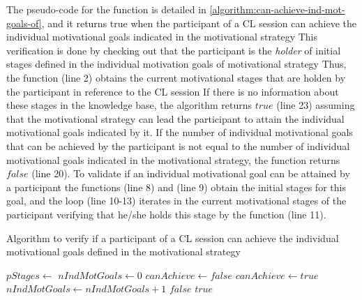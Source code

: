 The pseudo-code for the function  is detailed in \autoref{algorithm:can-achieve-ind-mot-goals-of}, and it returns true when the participant  of a CL session  can achieve the individual motivational goals indicated in the motivational strategy  This verification is done by checking out that the participant  is the \emph{holder} of initial stages defined in the individual motivation goals of motivational strategy  Thus, the function  (line 2) obtains the current motivational stages that are holden by the participant  in reference to the CL session  If there is no information about these stages in the knowledge base, the algorithm returns $true$ (line 23) assuming that the motivational strategy  can lead the participant  to attain the individual motivational goals indicated by it. If the number of individual motivational goals  that can be achieved by the participant  is not equal to the number of individual motivational goals indicated in the motivational strategy, the function returns $false$ (line 20). To validate if an individual motivational goal  can be attained by a participant  the functions  (line 8) and  (line 9) obtain the initial stages for this goal, and the loop  (line 10-13) iterates in the current motivational stages of the participant  verifying that he/she holds this stage by the function  (line 11).

\begin{algoritmo}
\caption{Algorithm to verify if a participant  of a CL session  can achieve the individual motivational goals defined in the motivational strategy }
\label{algorithm:can-achieve-ind-mot-goals-of}
\begin{algorithmic}[1]\small
{}
  \State $pStages \gets$ 
    \State $nIndMotGoals \gets 0$
      \State $canAchieve \gets false$
               $canAchieve \gets true$
              \EndIf
            \EndFor
          \EndFor
        \EndFor
      \EndFor
       $nIndMotGoals \gets nIndMotGoals + 1$
      \EndIf
    \EndFor
     \Return $false$
    \EndIf
  \EndIf
  \State \Return $true$
\EndFunction
\end{algorithmic}
\end{algoritmo}

